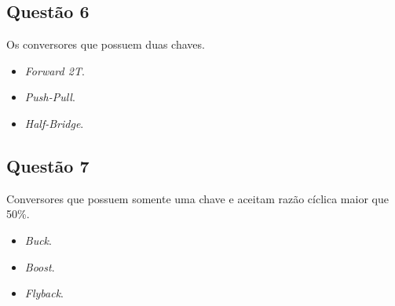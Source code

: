 \subsection{Questão 6}
Os conversores que possuem duas chaves.
\begin{itemize}
    \item \textit{Forward 2T}.
    \item \textit{Push-Pull}.
    \item \textit{Half-Bridge}.
\end{itemize}

\subsection{Questão 7}
Conversores que possuem somente uma chave e aceitam razão cíclica maior que 50\%.

\begin{itemize}
    \item \textit{Buck}.
    \item \textit{Boost}.
    \item \textit{Flyback}.
\end{itemize}